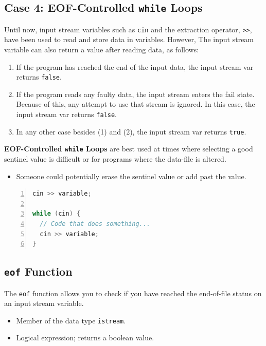 \documentclass{article}
\begin{document}
\subsection{Case 4: EOF-Controlled \texttt{while} Loops}

Until now, input stream variables such as \texttt{cin} and the extraction
operator, \texttt{>>}, have been used to read and store data in variables.
However, The input stream variable can also return a value after reading data,
as follows:
\begin{enumerate}
  \item If the program has reached the end of the input data, the input stream
    var returns \texttt{false}.
  \item If the program reads any faulty data, the input stream enters the fail
    state. Because of this, any attempt to use that stream is ignored. In this
    case, the input stream var returns \texttt{false}.
  \item In any other case besides (1) and (2), the input stream var returns
    \texttt{true}.
\end{enumerate}

\textbf{EOF-Controlled \texttt{while} Loops} are best used at times where
selecting a good sentinel value is difficult or for programs where the data-file
is altered.
\begin{itemize}
  \item Someone could potentially erase the sentinel value or add past the
    value.
\end{itemize}

\begin{lstlisting}[language=C++, caption={EOF-Controlled \texttt{while} Loop
  Example}, numbers=left]
cin >> variable;

while (cin) {
  // Code that does something...
  cin >> variable;
}
\end{lstlisting}


\subsection{\texttt{eof} Function}

The \texttt{eof} function allows you to check if you have reached the
end-of-file status on an input stream variable.
\begin{itemize}
  \item Member of the data type \texttt{istream}.
  \item Logical expression; returns a boolean value.
\end{itemize}
\end{document}
